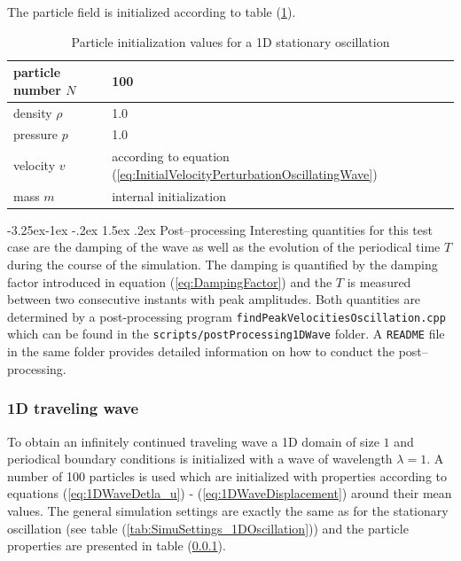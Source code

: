 \documentclass{report}
\makeatletter
\renewcommand\paragraph{\@startsection{paragraph}{4}{\z@}%
  {-3.25ex\@plus -1ex \@minus -.2ex}%
  {1.5ex \@plus .2ex}%
  {\normalfont\normalsize\bfseries}}
\makeatother
\begin{document}
The particle field is initialized according to table (\ref{tab:InitPartValues_1DOscillation}).

\begin{table}[h] %
\label{tab:InitPartValues_1DOscillation}
\centering

\begin{tabular}[c]{|l|p{5cm}|} %
\hline
\hline
particle number $N$ &  100\\
\hline
density $\rho$ &  1.0\\
\hline
pressure $p$ &  1.0\\
\hline
velocity $v$ & according to equation (\ref{eq:InitialVelocityPerturbationOscillatingWave})\\
\hline
mass $m$ & internal initialization\\
\hline
\hline
\end{tabular}
\caption[]{Particle initialization values for a 1D stationary oscillation}

\end{table}
\paragraph{Post--processing}
Interesting quantities for this test case are the damping of the wave as well as the evolution of the periodical time $T$ during the course of the simulation. The damping is quantified by the damping factor introduced in equation (\ref{eq:DampingFactor}) and the $T$ is measured between two consecutive instants with peak amplitudes. Both quantities are determined by a post-processing program {\tt findPeakVelocitiesOscillation.cpp} which can be found in the {\tt scripts/postProcessing1DWave} folder. A {\tt README} file in the same folder provides detailed information on how to conduct the post--processing.

\subsubsection{1D traveling wave}
To obtain an infinitely continued traveling wave a 1D domain of size $1$ and periodical boundary conditions is initialized with a wave of wavelength $\lambda=1$. A number of 100 particles is used which are initialized with properties according to equations (\ref{eq:1DWaveDetla_u}) - (\ref{eq:1DWaveDisplacement}) around their mean values.
The general simulation settings are exactly the same as for the stationary oscillation (see table (\ref{tab:SimuSettings_1DOscillation})) and the particle properties are presented in table (\ref{}).
\end{document}
